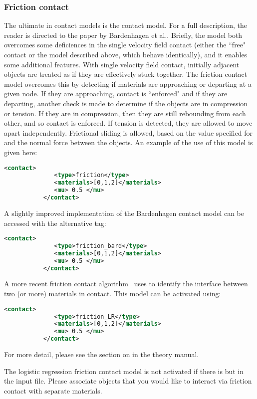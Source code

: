 \subsubsection{Friction contact}
The ultimate in contact models is the  contact 
model.  For a full description, the reader is directed to the paper by
Bardenhagen et al.\cite{Bard2001}.  Briefly, the model both overcomes
some deficiences in the single velocity field contact (either the ``free"
contact or the model described above, which behave identically), and it
enables some additional features.  With single velocity field contact,
initially adjacent objects are treated as if they are effectively stuck
together.  The friction contact model overcomes this by detecting if
materials are approaching or departing at a given node.  If they are
approaching, contact is ``enforced" and if they are departing, another
check is made to determine if the objects are in compression or tension.
If they are in compression, then they are still rebounding from each other,
and so contact is enforced.  If tension is detected, they are allowed
to move apart independently.  Frictional sliding is allowed, based on
the value specified for  and the normal force between
the objects.  An example of the use of this model is given here:

\begin{lstlisting}[language=XML]
           <contact>
              <type>friction</type>
              <materials>[0,1,2]</materials>
              <mu> 0.5 </mu>
           </contact>
\end{lstlisting}

A slightly improved implementation of the Bardenhagen contact model can be
accessed with the alternative tag:
\begin{lstlisting}[language=XML]
           <contact>
              <type>friction_bard</type>
              <materials>[0,1,2]</materials>
              <mu> 0.5 </mu>
           </contact>
\end{lstlisting}

A more recent friction contact algorithm~\cite{Nairn2020}  uses  to identify the interface between two (or more) materials in contact.
This model can be activated using:
\begin{lstlisting}[language=XML]
           <contact>
              <type>friction_LR</type>
              <materials>[0,1,2]</materials>
              <mu> 0.5 </mu>
           </contact>
\end{lstlisting}
For more detail, please see the section on 
in the theory manual.
\begin{WarningBox}
The logistic regression friction contact model is {\Red not} activated if there is  but  in the input file.  Please associate
objects that you would like to interact via friction contact with separate materials.
\end{WarningBox}

